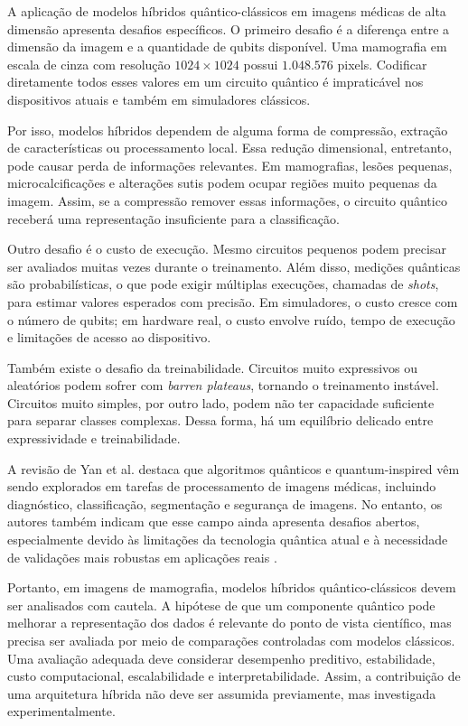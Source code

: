\documentclass[
    12pt,
    openright,
    oneside,
    a4paper,
    english,
    brazil
]{abntex2}
\begin{document}
A aplicação de modelos híbridos quântico-clássicos em imagens médicas de alta dimensão apresenta desafios específicos. O primeiro desafio é a diferença entre a dimensão da imagem e a quantidade de qubits disponível. Uma mamografia em escala de cinza com resolução \(1024 \times 1024\) possui \(1.048.576\) pixels. Codificar diretamente todos esses valores em um circuito quântico é impraticável nos dispositivos atuais e também em simuladores clássicos.

Por isso, modelos híbridos dependem de alguma forma de compressão, extração de características ou processamento local. Essa redução dimensional, entretanto, pode causar perda de informações relevantes. Em mamografias, lesões pequenas, microcalcificações e alterações sutis podem ocupar regiões muito pequenas da imagem. Assim, se a compressão remover essas informações, o circuito quântico receberá uma representação insuficiente para a classificação.

Outro desafio é o custo de execução. Mesmo circuitos pequenos podem precisar ser avaliados muitas vezes durante o treinamento. Além disso, medições quânticas são probabilísticas, o que pode exigir múltiplas execuções, chamadas de \textit{shots}, para estimar valores esperados com precisão. Em simuladores, o custo cresce com o número de qubits; em hardware real, o custo envolve ruído, tempo de execução e limitações de acesso ao dispositivo.

Também existe o desafio da treinabilidade. Circuitos muito expressivos ou aleatórios podem sofrer com \textit{barren plateaus}, tornando o treinamento instável. Circuitos muito simples, por outro lado, podem não ter capacidade suficiente para separar classes complexas. Dessa forma, há um equilíbrio delicado entre expressividade e treinabilidade.

A revisão de Yan et al. destaca que algoritmos quânticos e quantum-inspired vêm sendo explorados em tarefas de processamento de imagens médicas, incluindo diagnóstico, classificação, segmentação e segurança de imagens. No entanto, os autores também indicam que esse campo ainda apresenta desafios abertos, especialmente devido às limitações da tecnologia quântica atual e à necessidade de validações mais robustas em aplicações reais \cite{yan2024quantumMedicalImageReview}.

Portanto, em imagens de mamografia, modelos híbridos quântico-clássicos devem ser analisados com cautela. A hipótese de que um componente quântico pode melhorar a representação dos dados é relevante do ponto de vista científico, mas precisa ser avaliada por meio de comparações controladas com modelos clássicos. Uma avaliação adequada deve considerar desempenho preditivo, estabilidade, custo computacional, escalabilidade e interpretabilidade. Assim, a contribuição de uma arquitetura híbrida não deve ser assumida previamente, mas investigada experimentalmente.
\end{document}
